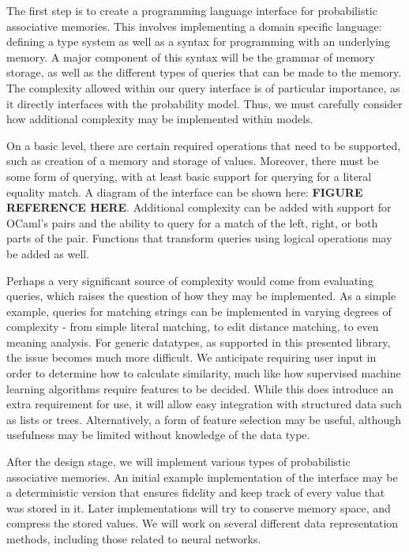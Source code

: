 \documentclass{sig-alternate}
\begin{document}
The first step is to create a programming language interface for probabilistic
associative memories. This involves implementing a domain specific language: 
defining a type system as well as a syntax for programming with an underlying memory.
A major component of this syntax will be the grammar of memory storage, 
as well as the different types of queries that can be made to the memory. The complexity allowed
within our query interface is of particular importance, as it directly
interfaces with the probability model. Thus, we must carefully consider 
how additional complexity may be implemented within models. 

On a basic level, there are certain required operations that need to be 
supported, such as creation of a memory and storage of values. Moreover,
there must be some form of querying, with at least basic support for querying
for a literal equality match. A diagram of the interface can be shown here: \textbf{FIGURE REFERENCE HERE}. 
Additional complexity can be added with support for OCaml's pairs and the 
ability to query for a match of the left, right, or both parts of the pair. Functions that transform
queries using logical operations may be added as well. 

Perhaps a very significant source of complexity would come from evaluating
queries, which raises the question
of how they may be implemented. 
As a simple example, queries for matching strings can be implemented in varying 
degrees of complexity - from simple literal matching, to edit distance matching, 
to even meaning analysis. For generic datatypes, as supported in this presented
library, the issue becomes much more difficult. We anticipate requiring user
input in order to determine how to calculate similarity, much like how 
supervised machine learning algorithms require features to be decided. 
While this does
introduce an extra requirement for use, it will allow easy integration with
structured data such as lists or trees. Alternatively, a form of feature
selection may be useful, although usefulness may be limited without knowledge
of the data type. 

After the design stage, we will implement various types of probabilistic associative memories.
An initial example implementation of the interface may be a deterministic version that
ensures fidelity and keep track of every value that
was stored in it. Later implementations will try to conserve memory space,
and compress the stored values. We will work on several different data representation methods,
including those related to neural networks. 
\end{document}
